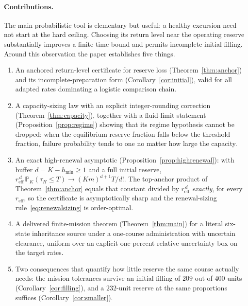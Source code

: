 \documentclass[11pt]{article}
\theoremstyle{remark}\newtheorem{remark}[theorem]{Remark}
\newcommand{\Prob}{\mathbb P}
\newcommand{\1}{\mathbf 1}
\newcommand{\reff}{r_{\mathrm{eff}}}
\begin{document}
\paragraph{Contributions.}
The main probabilistic tool is elementary but useful: a healthy excursion need not start at the hard ceiling. Choosing its return level near the operating reserve substantially improves a finite-time bound and permits incomplete initial filling. Around this observation the paper establishes five things.
\begin{enumerate}\itemsep2pt
\item An anchored return-level certificate for reserve loss (Theorem~\ref{thm:anchor}) and its incomplete-preparation form (Corollary~\ref{cor:initial}), valid for all adapted rates dominating a logistic comparison chain.
\item A capacity-sizing law with an explicit integer-rounding correction (Theorem~\ref{thm:capacity}), together with a fluid-limit statement (Proposition~\ref{prop:regime}) showing that its regime hypothesis cannot be dropped: when the equilibrium reserve fraction falls below the threshold fraction, failure probability tends to one no matter how large the capacity.
\item An exact high-renewal asymptotic (Proposition~\ref{prop:highrenewal}): with buffer $d=K-h_{\min}\ge1$ and a full initial reserve, $\reff^{\,d}\,\Prob_K(\tau_H\le T)\to(Km)^{d+1}T/d!$. The top-anchor product of Theorem~\ref{thm:anchor} equals that constant divided by $\reff^{\,d}$ \emph{exactly}, for every $\reff$, so the certificate is asymptotically sharp and the renewal-sizing rule~\eqref{eq:renewalsizing} is order-optimal.
\item A delivered finite-mission theorem (Theorem~\ref{thm:main}) for a literal six-state inheritance source under a one-course administration with uncertain clearance, uniform over an explicit one-percent relative uncertainty box on the target rates.
\item Two consequences that quantify how little reserve the same course actually needs: the mission tolerances survive an initial filling of $209$ out of $400$ units (Corollary~\ref{cor:filling}), and a $232$-unit reserve at the same proportions suffices (Corollary~\ref{cor:smaller}).
\end{enumerate}
\end{document}
